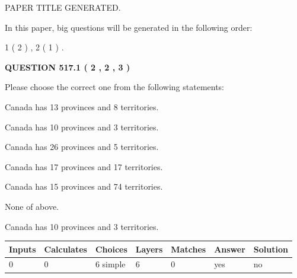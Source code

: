 \documentclass[12pt]{article}
\begin{document}
   
   
   
   
   
 \vspace{0.2in}
 
 
 
 
   
   
 PAPER TITLE GENERATED.
   
   
   
\vspace{0.2in}
   
In this paper, big questions will be generated in the following order: 
   
   
   1 ( 2 )
 ,
   2 ( 1 )
 .
  
\vspace{0.2in}
  
{\textbf{\Large{QUESTION
517.1 
 ( 2 , 2 , 3 )
}}}
  
  
Please choose the correct one from the following statements:
 
 
Canada has  13 provinces and  8 territories.
 
 
Canada has 10  provinces and 3 territories.
 
 
Canada has  26 provinces and  5 territories.
 
 
Canada has  17 provinces and  17 territories.
 
 
Canada has  15 provinces and  74 territories.
 
 
 None of above.
 
 
\noindent{}
 
 
Canada has 10  provinces and 3 territories.
 
 
\noindent{}
 
 
   
   
   
   
\noindent\begin{tabular}{|l|l|l|l|l|l|l|}
 \hline
Inputs & Calculates & Choices & Layers & Matches & Answer & Solution \\ \hline
 0  & 
 0  & 
 6
  simple  
  & 
 6  & 
 0  & 
  yes & 
  no 
  \\ \hline
 \end{tabular}
   
\end{document}
